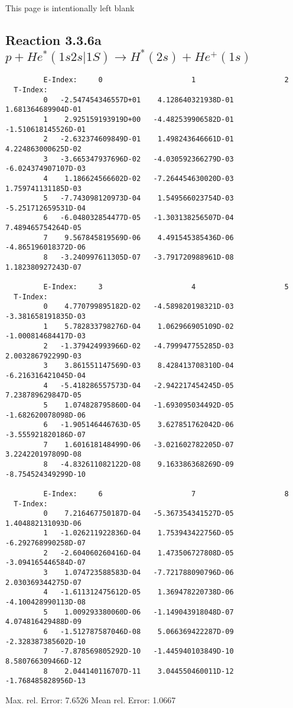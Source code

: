 \documentclass[12pt]{article}
\begin{document}
\newpage
This page is intentionally left blank
\newpage
\subsection{
Reaction 3.3.6a  $ p + He^*(1s2s|1S) \rightarrow H^*(2s) + He^+(1s) $
}


\begin{small}\begin{verbatim}
         E-Index:     0                     1                     2
  T-Index:
         0   -2.547454346557D+01    4.128640321938D-01    1.681364689904D-01
         1    2.925159193919D+00   -4.482539906582D-01   -1.510618145526D-01
         2   -2.632374609849D-01    1.498243646661D-01    4.224863000625D-02
         3   -3.665347937696D-02   -4.030592366279D-03   -6.024374907107D-03
         4    1.186624566602D-02   -7.264454630020D-03    1.759741131185D-03
         5   -7.743098120973D-04    1.549566023754D-03   -5.251712659531D-04
         6   -6.048032854477D-05   -1.303138256507D-04    7.489465754264D-05
         7    9.567845819569D-06    4.491545385436D-06   -4.865196018372D-06
         8   -3.240997611305D-07   -3.791720988961D-08    1.182380927243D-07

         E-Index:     3                     4                     5
  T-Index:
         0    4.770799895182D-02   -4.589820198321D-03   -3.381658191835D-03
         1    5.782833798276D-04    1.062966905109D-02   -1.000814684417D-03
         2   -1.379424993966D-02   -4.799947755285D-03    2.003286792299D-03
         3    3.861551147569D-03    8.428413708310D-04   -6.216316421045D-04
         4   -5.418286557573D-04   -2.942217454245D-05    7.238789629847D-05
         5    1.074828795860D-04   -1.693095034492D-05   -1.682620078098D-06
         6   -1.905146446763D-05    3.627851762042D-06   -3.555921820186D-07
         7    1.601618148499D-06   -3.021602782205D-07    3.224220197809D-08
         8   -4.832611082122D-08    9.163386368269D-09   -8.754524349299D-10

         E-Index:     6                     7                     8
  T-Index:
         0    7.216467750187D-04   -5.367354341527D-05    1.404882131093D-06
         1   -1.026211922836D-04    1.753943422756D-05   -6.292768990258D-07
         2   -2.604060260416D-04    1.473506727808D-05   -3.094165446584D-07
         3    1.074723588583D-04   -7.721788090796D-06    2.030369344275D-07
         4   -1.611312475612D-05    1.369478220738D-06   -4.100428990113D-08
         5    1.009293380060D-06   -1.149043918048D-07    4.074816429488D-09
         6   -1.512787587046D-08    5.066369422287D-09   -2.328387385602D-10
         7   -7.878569805292D-10   -1.445940103849D-10    8.580766309466D-12
         8    2.044140116707D-11    3.044550460011D-12   -1.768485828956D-13

\end{verbatim}\end{small}
  Max. rel. Error:   7.6526 %
  Mean rel. Error:   1.0667 %
\end{document}
